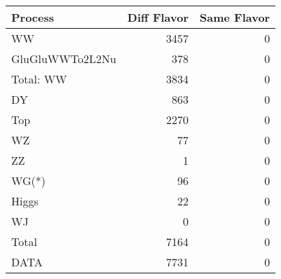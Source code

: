 \begin{table}[ht]
	\centering
\begin{tabular}{lrr}

         Process &  Diff Flavor &  Same Flavor \\
		\hline
              WW &         3457 &            0 \\
 GluGluWWTo2L2Nu &          378 &            0 \\
\hline
       Total: WW &         3834 &            0 \\
              DY &          863 &            0 \\
             Top &         2270 &            0 \\
              WZ &           77 &            0 \\
              ZZ &            1 &            0 \\
           WG(*) &           96 &            0 \\
           Higgs &           22 &            0 \\
              WJ &            0 &            0 \\
\hline
           Total &         7164 &            0 \\
            DATA &         7731 &            0 \\


\end{tabular}

\end{table}